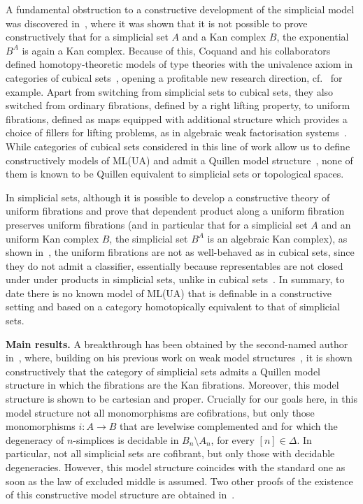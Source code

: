 \documentclass[reqno,10pt,a4paper,oneside,draft]{amsart}
\numberwithin{equation}{section}
\theoremstyle{mythm}
\theoremstyle{mydef}
\theoremstyle{myrmk}
\newcommand{\co}{\colon}
\begin{document}
A fundamental obstruction to a constructive development of  the simplicial model was discovered in~\cite{coquand-non-constructivity-kan}, where it was shown that
it is not possible to prove constructively that for a simplicial set $A$ and a
Kan complex $B$, the exponential~$B^A$ is again a Kan complex.
Because of this, Coquand and his collaborators  defined homotopy-theoretic models of type
theories with the univalence axiom in categories of cubical sets~\cite{coquand-cubical-sets}, opening a profitable new research direction, cf.~\cite{awodey-cubical,cohen-et-al:cubicaltt,PittsAM:aximct} for example. Apart from switching 
from simplicial sets to cubical sets, they also switched from ordinary fibrations, defined by a right lifting property,
to uniform fibrations, defined as maps equipped with additional structure which 
 provides a choice of fillers for lifting problems, as in algebraic weak factorisation systems~\cite{garner:small-object-argument,grandis-tholen-nwfs}. While 
categories of cubical sets considered in this line of work allow us to define constructively models of 
ML(UA) and admit a Quillen
model structure~\cite{SattlerC:equepu}, none of them
 is known to be Quillen equivalent to simplicial sets or topological spaces.

In simplicial sets, although it is possible to develop  a constructive theory of uniform fibrations and prove that dependent product along a uniform fibration preserves
uniform fibrations (and in particular that for a simplicial set $A$ and an 
uniform Kan complex $B$, the simplicial set $B^A$ is an algebraic Kan complex),
  as shown in~\cite{gambino2017frobenius}, the uniform fibrations
are not as well-behaved as in cubical sets,
since they do not admit a classifier, essentially because 
representables are not closed under under products in simplicial sets, unlike in cubical sets~\cite{SattlerC:faiaut}. 
In summary, to date there is no known model of ML(UA) that is definable in a constructive setting and
based on a category homotopically equivalent to that of simplicial sets. 

\smallskip

\noindent
\textbf{Main results.}
A breakthrough has been obtained  by the second-named author in~\cite{henry2019qms}, where, building on his previous work on weak model structures~\cite{henry2018wms},
it is shown constructively that the category of simplicial sets admits a Quillen model structure in which the
fibrations are the Kan fibrations. Moreover, this model structure is shown to be cartesian and proper.  Crucially for our goals here,  in this model structure not all monomorphisms are 
cofibrations, but only those monomorphisms $i \co A \to B$ that are levelwise complemented 
and for which the degeneracy of $n$-simplices is decidable in $B_n \setminus A_n$, for every $[n] \in \Delta$. In particular, not all simplicial sets are cofibrant, but only those with decidable degeneracies. However, this model structure coincides with
the standard one as soon as the law of excluded middle is assumed. Two other  
proofs of the  existence of this constructive
model structure are obtained in~\cite{GambinoN:anocp}. 
\end{document}
